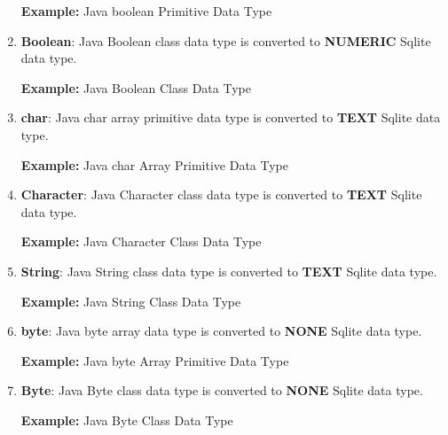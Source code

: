 \begin{enumerate}
		\par
		\textbf{Example:} Java boolean Primitive Data Type
			

	\item \small \textbf{Boolean}: Java Boolean class data type is converted to \textbf{NUMERIC} Sqlite data type.

		\par
		\textbf{Example:} Java Boolean Class Data Type
			

	\item \small \textbf{char}: Java char array primitive data type is converted to \textbf{TEXT} Sqlite data type.

		\par
		\textbf{Example:} Java char Array Primitive Data Type
			

	\item \small \textbf{Character}: Java Character class data type is converted to \textbf{TEXT} Sqlite data type.

		\par
		\textbf{Example:} Java Character Class Data Type
			

	\item \small \textbf{String}: Java String class data type is converted to \textbf{TEXT} Sqlite data type.

		\par
		\textbf{Example:} Java String Class Data Type
			

	\item \small \textbf{byte}: Java byte array data type is converted to \textbf{NONE} Sqlite data type.

		\par
		\textbf{Example:} Java byte Array Primitive Data Type
			

	\item \small \textbf{Byte}: Java Byte class data type is converted to \textbf{NONE} Sqlite data type.

		\par
		\textbf{Example:} Java Byte Class Data Type
			


\end{enumerate}
